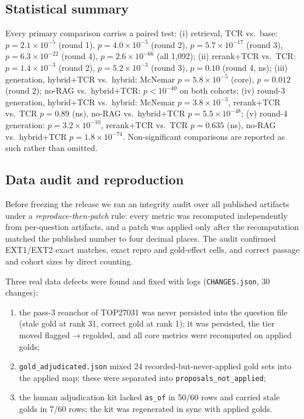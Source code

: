 \documentclass[10pt,a4paper,twocolumn]{article}
\newcommand{\code}[1]{\texttt{#1}}
\begin{document}
\subsection{Statistical summary}

Every primary comparison carries a paired test: (i) retrieval, TCR vs.\ base: $p=2.1\times10^{-5}$ (round 1), $p=4.0\times10^{-5}$ (round 2), $p=5.7\times10^{-17}$ (round 3), $p=6.3\times10^{-22}$ (round 4), $p=2.6\times10^{-66}$ (all 1,092); (ii) rerank+TCR vs.\ TCR: $p=1.4\times10^{-3}$ (round 2), $p=5.2\times10^{-3}$ (round 3), $p=0.10$ (round 4, ns); (iii) generation, hybrid+TCR vs.\ hybrid: McNemar $p=5.8\times10^{-5}$ (core), $p=0.012$ (round 2); no-RAG vs.\ hybrid+TCR: $p<10^{-40}$ on both cohorts; (iv) round-3 generation, hybrid+TCR vs.\ hybrid: McNemar $p=3.8\times10^{-3}$, rerank+TCR vs.\ TCR $p=0.89$ (ns), no-RAG vs.\ hybrid+TCR $p=5.5\times10^{-48}$; (v) round-4 generation: $p=3.2\times10^{-10}$, rerank+TCR vs.\ TCR $p=0.635$ (ns), no-RAG vs.\ hybrid+TCR $p=1.8\times10^{-74}$. Non-significant comparisons are reported as such rather than omitted.

\subsection{Data audit and reproduction}
\label{sec:audit}

Before freezing the release we ran an integrity audit over all published artifacts under a \emph{reproduce-then-patch} rule: every metric was recomputed independently from per-question artifacts, and a patch was applied only after the recomputation matched the published number to four decimal places. The audit confirmed EXT1/EXT2 exact matches, exact repro and gold-effect cells, and correct passage and cohort sizes by direct counting.

Three real data defects were found and fixed with logs (\code{CHANGES.json}, 30 changes):

\begin{enumerate}
\item[(B1)] the pass-3 reanchor of TOP27031 was never persisted into the question file (stale gold at rank 31, correct gold at rank 1); it was persisted, the tier moved flagged$\rightarrow$regolded, and all core metrics were recomputed on applied golds;
\item[(B2)] \code{gold\_adjudicated.json} mixed 24 recorded-but-never-applied gold sets into the applied map; these were separated into \code{proposals\_not\_applied};
\item[(B3)] the human adjudication kit lacked \code{as\_of} in 50/60 rows and carried stale golds in 7/60 rows; the kit was regenerated in sync with applied golds.
\end{enumerate}
\end{document}
